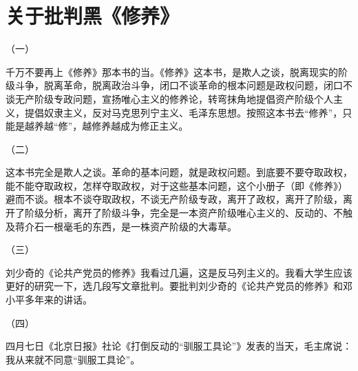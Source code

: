 \section[关于批判黑《修养》（一九六七年三月、四月）]{关于批判黑《修养》}


（一）

千万不要再上《修养》那本书的当。《修养》这本书，是欺人之谈，脱离现实的阶级斗争，脱离革命，脱离政治斗争，闭口不谈革命的根本问题是政权问题，闭口不谈无产阶级专政问题，宣扬唯心主义的修养论，转弯抹角地提倡资产阶级个人主义，提倡奴隶主义，反对马克思列宁主义、毛泽东思想。按照这本书去“修养”，只能是越养越“修”，越修养越成为修正主义。


（二）

这本书完全是欺人之谈。革命的基本问题，就是政权问题。到底要不要夺取政权，能不能夺取政权，怎样夺取政权，对于这些基本问题，这个小册子（即《修养》）避而不谈。根本不谈夺取政权，不谈无产阶级专政，离开了政权，离开了阶级，离开了阶级分析，离开了阶级斗争，完全是一本资产阶级唯心主义的、反动的、不触及蒋介石一根毫毛的东西，是一株资产阶级的大毒草。


（三）

刘少奇的《论共产党员的修养》我看过几遍，这是反马列主义的。我看大学生应该更好的研究一下，选几段写文章批判。要批判刘少奇的《论共产党员的修养》和邓小平多年来的讲话。

（四）

四月七日《北京日报》社论《打倒反动的“驯服工具论”》发表的当天，毛主席说：我从来就不同意“驯服工具论”。



